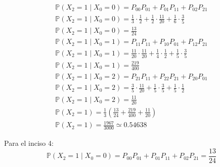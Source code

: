 \documentclass{article}
\begin{document}
            \begin{gather*}
                \mathbb{P}(X_2 = 1 \mid X_0 = 0) = P_{00} P_{01} + P_{01} P_{11} + P_{02} P_{21} \\
                \mathbb{P}(X_2 = 1 \mid X_0 = 0) = \frac{1}{3} \cdot \frac{1}{2} + \frac{1}{2} \cdot \frac{11}{20} + \frac{1}{6} \cdot \frac{3}{5} \\
                \mathbb{P}(X_2 = 1 \mid X_0 = 0) = \frac{13}{24} \\
                \mathbb{P}(X_2 = 1 \mid X_0 = 1) = P_{11} P_{11} + P_{10} P_{01} + P_{12} P_{21} \\
                \mathbb{P}(X_2 = 1 \mid X_0 = 1) = \frac{11}{20} \cdot \frac{11}{20} + \frac{1}{4} \cdot \frac{1}{2} + \frac{1}{5} \cdot \frac{3}{5} \\
                \mathbb{P}(X_2 = 1 \mid X_0 = 1) = \frac{219}{400} \\
                \mathbb{P}(X_2 = 1 \mid X_0 = 2) = P_{21} P_{11} + P_{22} P_{21} + P_{20} P_{01} \\
                \mathbb{P}(X_2 = 1 \mid X_0 = 2) = \frac{3}{5} \cdot \frac{11}{20} + \frac{1}{5} \cdot \frac{3}{5} + \frac{1}{5} \cdot \frac{1}{2} \\
                \mathbb{P}(X_2 = 1 \mid X_0 = 2) = \frac{11}{20} \\
                \mathbb{P}(X_2 = 1) = \frac{1}{3} \left(\frac{13}{24} + \frac{219}{400} + \frac{11}{20}\right) \\
                \mathbb{P}(X_2 = 1) = \frac{1967}{3000} \simeq 0.54638
            \end{gather*}

            Para el inciso 4:
            \begin{equation*}
                \mathbb{P}(X_2 = 1 \mid X_0 = 0) = P_{00} P_{01} + P_{01} P_{11} + P_{02} P_{21} = \frac{13}{24}
            \end{equation*}
\end{document}

